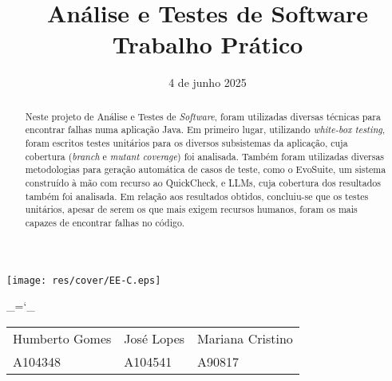 \documentclass[12pt, a4paper]{article}
\title{\Huge \textbf{Análise e Testes de Software \\ \Large Trabalho Prático}}
\date{4 de junho 2025}
\begin{document}
\begin{center}
    \texttt{[image: res/cover/EE-C.eps]}
\end{center}

\chardef\_=`_
\onehalfspacing
\setlength{\parskip}{\baselineskip}
\setlength{\parindent}{0pt}
\def\arraystretch{1.5}

{\let\newpage\relax\maketitle}
\maketitle
\thispagestyle{empty}

\vspace{\fill}

\begin{adjustwidth}{-2cm}{-2cm} %
    \begin{center}
        \begin{tabular}{>{\centering}p{}
                        >{\centering}p{}
                        >{\centering\arraybackslash}p{}}

            Humberto Gomes & José Lopes & Mariana Cristino \\
            A104348        & A104541    & A90817
        \end{tabular}
    \end{center}
\end{adjustwidth}

\pagebreak

\begin{abstract}
    Neste projeto de Análise e Testes de \emph{Software}, foram utilizadas diversas técnicas para
    encontrar falhas numa aplicação Java. Em primeiro lugar, utilizando \emph{white-box testing},
    foram escritos testes unitários para os diversos subsistemas da aplicação, cuja cobertura
    (\emph{branch} e \emph{mutant coverage}) foi analisada. Também foram utilizadas diversas
    metodologias para geração automática de casos de teste, como o EvoSuite, um sistema construído à
    mão com recurso ao QuickCheck, e LLMs, cuja cobertura dos resultados também foi analisada. Em
    relação aos resultados obtidos, concluiu-se que os testes unitários, apesar de serem os que
    mais exigem recursos humanos, foram os mais capazes de encontrar falhas no código.
\end{abstract}
\end{document}
